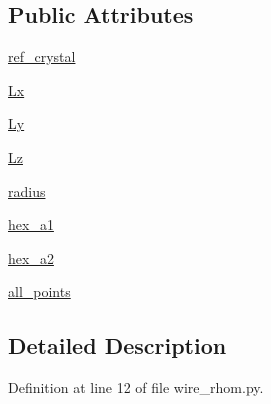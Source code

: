 \subsection*{Public Attributes}
\begin{DoxyCompactItemize}
\item 
\hyperlink{class_d_f_t___k_i_t_1_1apps_1_1wire__rhom_1_1_rhom__trigonal__nanowire_a24be6451c8eea10c855b4894e7319e82}{ref\+\_\+crystal}
\item 
\hyperlink{class_d_f_t___k_i_t_1_1apps_1_1wire__rhom_1_1_rhom__trigonal__nanowire_a342afa8a5416b188a5938b0572c2abf9}{Lx}
\item 
\hyperlink{class_d_f_t___k_i_t_1_1apps_1_1wire__rhom_1_1_rhom__trigonal__nanowire_a5e4b1d53b0fd2aa4f6d3f0f51b1b182c}{Ly}
\item 
\hyperlink{class_d_f_t___k_i_t_1_1apps_1_1wire__rhom_1_1_rhom__trigonal__nanowire_a87a9ce98f3c0724d7ffd9cf4562262fc}{Lz}
\item 
\hyperlink{class_d_f_t___k_i_t_1_1apps_1_1wire__rhom_1_1_rhom__trigonal__nanowire_ad2f62d13d4541e9c45097aa8bd084fd6}{radius}
\item 
\hyperlink{class_d_f_t___k_i_t_1_1apps_1_1wire__rhom_1_1_rhom__trigonal__nanowire_aa1495a694e9e0414219f8821c03c9cd4}{hex\+\_\+a1}
\item 
\hyperlink{class_d_f_t___k_i_t_1_1apps_1_1wire__rhom_1_1_rhom__trigonal__nanowire_aab46e89964027acc5ade4a9a0138db4e}{hex\+\_\+a2}
\item 
\hyperlink{class_d_f_t___k_i_t_1_1apps_1_1wire__rhom_1_1_rhom__trigonal__nanowire_a7d2b3c313795b90d803abe40abee80d9}{all\+\_\+points}
\end{DoxyCompactItemize}


\subsection{Detailed Description}


Definition at line 12 of file wire\+\_\+rhom.\+py.




